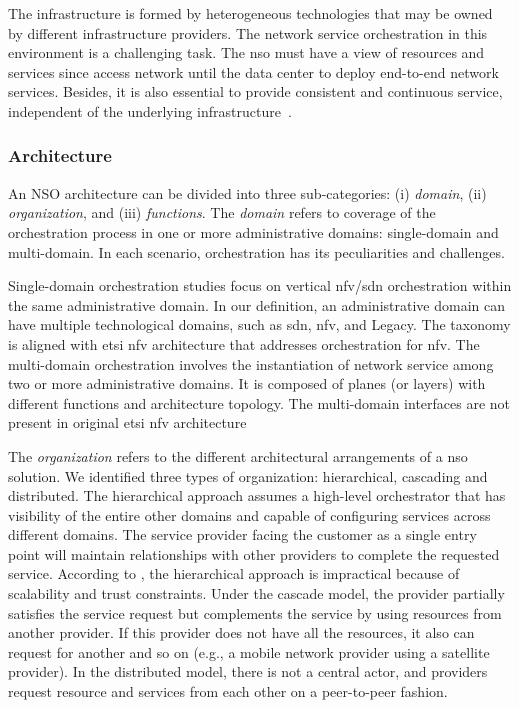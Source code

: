 The infrastructure is formed by heterogeneous technologies that may be owned by different infrastructure providers. The network service orchestration in this environment is a challenging task. The \gls{nso} must have a view of resources and services since access network until the data center to deploy end-to-end network services. Besides, it is also essential to provide consistent and continuous service, independent of the underlying infrastructure~\cite{5GPPPArchitectureWorkingGroup2016ViewArchitecture}. 

\subsubsection{Architecture}
An NSO architecture can be divided into three sub-categories: (i) \textit{domain}, (ii) \textit{organization}, and (iii) \textit{functions}. The \textit{domain} refers to coverage of the orchestration process in one or more administrative domains: single-domain and multi-domain. In each scenario, orchestration has its peculiarities and challenges.

Single-domain orchestration studies focus on vertical \gls{nfv}/\gls{sdn} orchestration within the same administrative domain. In our definition, an administrative domain can have multiple technological domains, such as \gls{sdn}, \gls{nfv}, and Legacy. The taxonomy is aligned with \gls{etsi} \gls{nfv} architecture that addresses orchestration for \gls{nfv}. The multi-domain orchestration involves the instantiation of network service among two or more administrative domains. It is composed of planes (or layers) with different functions and architecture topology. The multi-domain interfaces are not present in original \gls{etsi} \gls{nfv} architecture

The \textit{organization} refers to the different architectural arrangements of a \gls{nso} solution. We identified three types of organization: hierarchical, cascading and distributed. The hierarchical approach assumes a high-level orchestrator that has visibility of the entire other domains and capable of configuring services across different domains. The service provider facing the customer as a single entry point will maintain relationships with other providers to complete the requested service. According to \cite{Bohn2011NISTArchitecture}, the hierarchical approach is impractical because of scalability and trust constraints.  
Under the cascade model, the provider partially satisfies the service request but complements the service by using resources from another provider. If this provider does not have all the resources, it also can request for another and so on (e.g., a mobile network provider using a satellite provider). In the distributed model, there is not a central actor, and providers request resource and services from each other on a peer-to-peer fashion.

